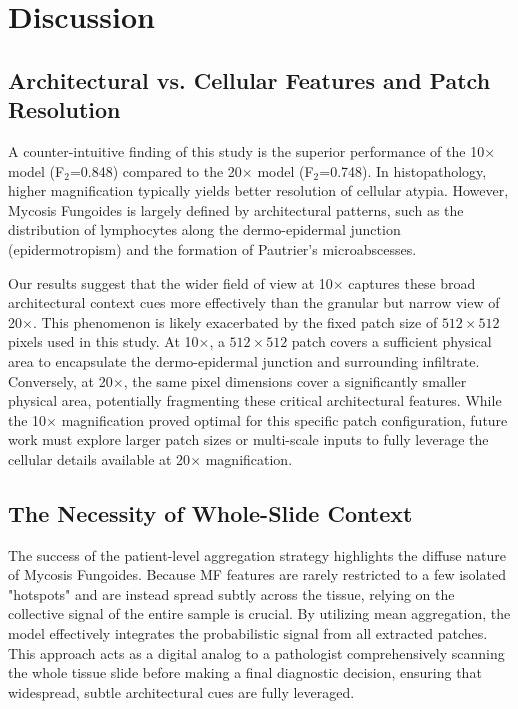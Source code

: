 \documentclass[conference]{IEEEtran}
\begin{document}
\section{Discussion}
\subsection{Architectural vs. Cellular Features and Patch Resolution}
A counter-intuitive finding of this study is the superior performance of the 10$\times$ model (F$_2$=0.848) compared to the 20$\times$ model (F$_2$=0.748). In histopathology, higher magnification typically yields better resolution of cellular atypia. However, Mycosis Fungoides is largely defined by architectural patterns, such as the distribution of lymphocytes along the dermo-epidermal junction (epidermotropism) and the formation of Pautrier's microabscesses.

Our results suggest that the wider field of view at 10$\times$ captures these broad architectural context cues more effectively than the granular but narrow view of 20$\times$. This phenomenon is likely exacerbated by the fixed patch size of $512 \times 512$ pixels used in this study. At 10$\times$, a $512 \times 512$ patch covers a sufficient physical area to encapsulate the dermo-epidermal junction and surrounding infiltrate. Conversely, at 20$\times$, the same pixel dimensions cover a significantly smaller physical area, potentially fragmenting these critical architectural features. While the 10$\times$ magnification proved optimal for this specific patch configuration, future work must explore larger patch sizes or multi-scale inputs to fully leverage the cellular details available at 20$\times$ magnification.

\subsection{The Necessity of Whole-Slide Context}
The success of the patient-level aggregation strategy highlights the diffuse nature of 
Mycosis Fungoides. Because MF features are rarely restricted to a few isolated "hotspots" 
and are instead spread subtly across the tissue, relying on the collective signal 
of the entire sample is crucial. By utilizing mean aggregation, the model effectively 
integrates the probabilistic signal from all extracted patches. This approach acts as a 
digital analog to a pathologist comprehensively scanning the whole tissue slide before 
making a final diagnostic decision, ensuring that widespread, subtle architectural cues 
are fully leveraged.
\end{document}
